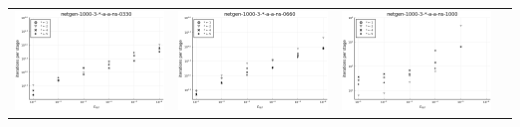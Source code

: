 \documentclass{article}
\begin{document}
\begin{landscape}
\begin{center}
\begin{longtable}{| c | c | c | c |}
\includegraphics[height=0.22\textheight]{itepst_fixlim_netgen-1000-3-_-a-a-ns-0330.png} &
\includegraphics[height=0.22\textheight]{itepst_fixlim_netgen-1000-3-_-a-a-ns-0660.png} &
\includegraphics[height=0.22\textheight]{itepst_fixlim_netgen-1000-3-_-a-a-ns-1000.png} \\

\end{longtable}
\end{center}
\end{landscape}
\end{document}
